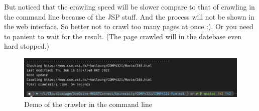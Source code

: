 \documentclass{article}
\begin{document}
            But noticed that the crawling speed will be slower compare to that of crawling in the command line because of the JSP stuff. And the process will not be shown in the web interface. So better not to crawl too many pages at once :). Or you need to panient to wait for the result. (The page crawled will in the datebase even hard stopped.)
            \begin{figure}[!h]
                \centering
                \label{}
                \includegraphics[width=15cm]{crawl_in_local.png}
                \caption{Demo of the crawler in the command line}
            \end{figure}
\end{document}
